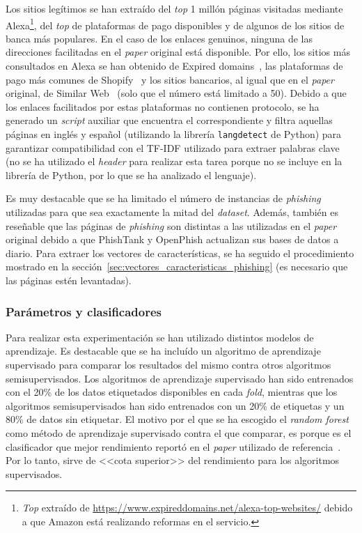 Los sitios legítimos se han extraído del \textit{top} 1 millón páginas visitadas mediante Alexa\footnote{\textit{Top} extraído de \url{https://www.expireddomains.net/alexa-top-websites/} debido a que Amazon está realizando reformas en el servicio.}, del \textit{top} de plataformas de pago disponibles y de algunos de los sitios de banca más populares. En el caso de los enlaces genuinos, ninguna de las direcciones facilitadas en el \textit{paper} original está disponible. Por ello, los sitios más consultados en Alexa se han obtenido de Expired domains~\cite{AlexaTopWebsites}, las plataformas de pago más comunes de Shopify~\cite{paymentGatewaysWebsites} y los sitios bancarios, al igual que en el \textit{paper} original, de Similar Web~\cite{banksitesTop} (solo que el número está limitado a 50). Debido a que los enlaces facilitados por estas plataformas no contienen protocolo, se ha generado un \textit{script} auxiliar que encuentra el correspondiente y filtra aquellas páginas en inglés y español (utilizando la librería \texttt{langdetect} de Python) para garantizar compatibilidad con el TF-IDF utilizado para extraer palabras clave (no se ha utilizado el \textit{header} para realizar esta tarea porque no se incluye en la librería de Python, por lo que se ha analizado el lenguaje).

Es muy destacable que se ha limitado el número de instancias de \textit{phishing} utilizadas para que sea exactamente la mitad del \textit{dataset}. Además, también es reseñable que las páginas de \textit{phishing} son distintas a las utilizadas en el \textit{paper} original debido a que PhishTank y OpenPhish actualizan sus bases de datos a diario. Para extraer los vectores de características, se ha seguido el procedimiento mostrado en la sección~\ref{sec:vectores_caracteristicas_phishing} (es necesario que las páginas estén levantadas).

\subsubsection{Parámetros y clasificadores}

Para realizar esta experimentación se han utilizado distintos modelos de aprendizaje. Es destacable que se ha incluído un algoritmo de aprendizaje supervisado para comparar los resultados del mismo contra otros algoritmos semisupervisados. Los algoritmos de aprendizaje supervisado han sido entrenados con el 20\% de los datos etiquetados disponibles en cada \textit{fold}, mientras que los algoritmos semisupervisados han sido entrenados con un 20\% de etiquetas y un 80\% de datos sin etiquetar. El motivo por el que se ha escogido el \textit{random forest} como método de aprendizaje supervisado contra el que comparar, es porque es el clasificador que mejor rendimiento reportó en el \textit{paper} utilizado de referencia~\cite{featuresPhishing2018Gupta}. Por lo tanto, sirve de <<cota superior>> del rendimiento para los algoritmos supervisados.


